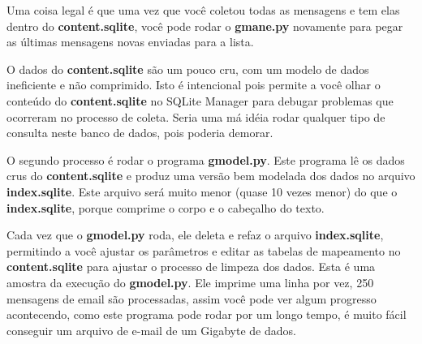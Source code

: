 Uma coisa legal é que uma vez que você coletou todas as mensagens e tem elas dentro do
{\bf content.sqlite}, você pode rodar o {\bf gmane.py} novamente para pegar as últimas 
mensagens novas enviadas para a lista.

O dados do {\bf content.sqlite} são um pouco cru, com um modelo de dados ineficiente
e não comprimido.
Isto é intencional pois permite a você olhar o conteúdo do {\bf content.sqlite}
no SQLite Manager para debugar problemas que ocorreram no processo de coleta.
Seria uma má idéia rodar qualquer tipo de consulta neste banco de dados, pois
poderia demorar.  

O segundo processo é rodar o programa {\bf gmodel.py}. Este programa lê os dados crus do
{\bf content.sqlite} e produz uma versão bem modelada dos dados no arquivo {\bf index.sqlite}.
Este arquivo será muito menor (quase 10 vezes menor) do que o {\bf index.sqlite}, porque 
comprime o corpo e o cabeçalho do texto.

Cada vez que o {\bf gmodel.py} roda, ele deleta e refaz o arquivo {\bf index.sqlite},
permitindo a você ajustar os parâmetros e editar as tabelas de mapeamento no {\bf content.sqlite}
para ajustar o processo de limpeza dos dados. Esta é uma amostra da execução do {\bf gmodel.py}.
Ele imprime uma linha por vez, 250 mensagens de email são processadas, assim você pode ver
algum progresso acontecendo, como este programa pode rodar por um longo tempo, é muito
fácil conseguir um arquivo de e-mail de um Gigabyte de dados.

